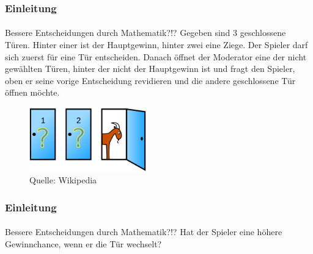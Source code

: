 \documentclass{beamer}
\begin{document}
\begin{frame}
    \frametitle{Einleitung}
\framesubtitle{}

\begin{block}{Bessere Entscheidungen durch Mathematik?!?}
Gegeben sind 3 geschlossene Türen.  Hinter einer ist der Hauptgewinn, hinter zwei eine Ziege.
Der Spieler darf  sich zuerst für eine Tür entscheiden. 
Danach öffnet der Moderator eine der  nicht gewählten Türen, hinter der nicht der Hauptgewinn ist und fragt den Spieler, oben er seine vorige Entscheidung revidieren und die andere geschlossene Tür öffnen möchte.
\end{block}

\begin{figure}[htp]
      \centering
    \includegraphics[width=0.45\textwidth]{img/Monty_open}

      \caption{Quelle: Wikipedia}
\end{figure}

 \end{frame}

\begin{frame}
    \frametitle{Einleitung}
\framesubtitle{}

\begin{block}{Bessere Entscheidungen durch Mathematik?!?}
Hat der Spieler eine höhere Gewinnchance, wenn er die Tür wechselt?
\end{block}

 \end{frame}
\end{document}
